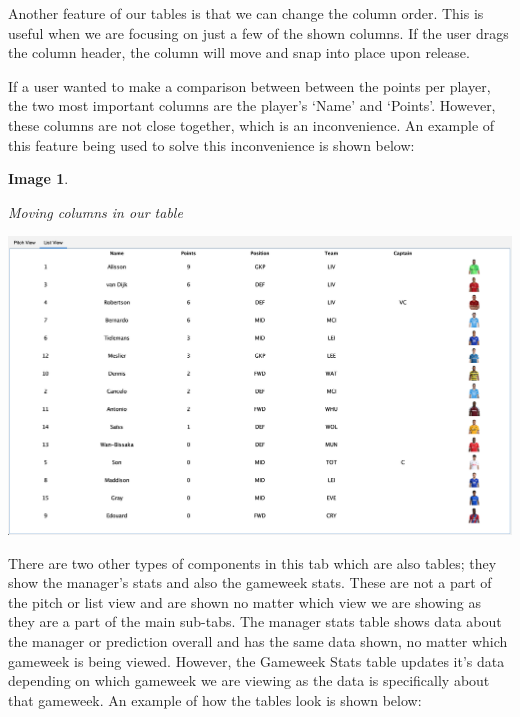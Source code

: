 \documentclass[12pt, a4paper, oneside]{book}
\newtheorem{image}[theorem]{Image}
\numberwithin{equation}{section}
\begin{document}
Another feature of our tables is that we can change the column order. This is useful when we are focusing on just a few of the shown columns. If the user drags the column header, the column will move and snap into place upon release.

If a user wanted to make a comparison between between the points per player, the two most important columns are the player's `Name' and `Points'. However, these columns are not close together, which is an inconvenience. An example of this feature being used to solve this inconvenience is shown below:

\begin{image} \label{Moving columns in our table}

  Moving columns in our table

  \vspace{0.5cm}

  \centerline{\includegraphics[width=1\textwidth]{images/gui/fantasy-tab/team-list-view-columns-moved.png}}

\end{image}

There are two other types of components in this tab which are also tables; they show the manager's stats and also the gameweek stats. These are not a part of the pitch or list view and are shown no matter which view we are showing as they are a part of the main sub-tabs. The manager stats table shows data about the manager or prediction overall and has the same data shown, no matter which gameweek is being viewed. However, the Gameweek Stats table updates it's data depending on which gameweek we are viewing as the data is specifically about that gameweek. An example of how the tables look is shown below:
\end{document}
